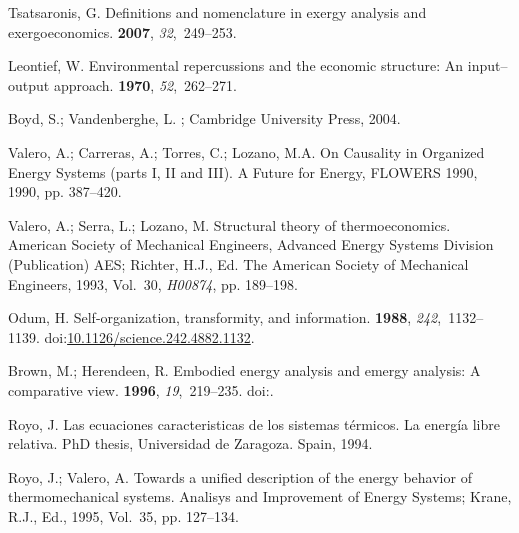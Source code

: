 \documentclass[energies,article,submit,moreauthors,pdftex]{Definitions/mdpi}
\begin{document}
\begin{thebibliography}{99}
	Tsatsaronis, G.
	\newblock Definitions and nomenclature in exergy analysis and exergoeconomics.
	 {\bf 2007}, {\em 32},~249--253.
	
	Leontief, W.
	\newblock Environmental repercussions and the economic structure: An input--output approach.
	 {\bf 1970}, {\em 52},~262--271.
	
	Boyd, S.; Vandenberghe, L.
	; Cambridge University Press,  2004.
	
	Valero, A.; Carreras, A.; Torres, C.; Lozano, M.A.
	\newblock On {C}ausality in {O}rganized {E}nergy {S}ystems (parts {I}, {II} and {III}).
	\newblock  A Future for Energy, FLOWERS 1990,  1990, pp. 387--420.
	
	Valero, A.; Serra, L.; Lozano, M.
	\newblock Structural theory of thermoeconomics.
	\newblock  American Society of Mechanical Engineers, Advanced Energy Systems Division (Publication) AES; Richter, H.J., Ed. The American Society of Mechanical Engineers,  1993, Vol.~30, {\em H00874}, pp. 189--198.
	
	Odum, H.
	\newblock Self-organization, transformity, and information.
	 {\bf 1988}, {\em 242},~1132--1139.
	\newblock doi:{\url{10.1126/science.242.4882.1132}}.
	
	Brown, M.; Herendeen, R.
	\newblock Embodied energy analysis and emergy analysis: A comparative view.
	 {\bf 1996}, {\em 19},~219--235.
	\newblock doi:{\href{https://doi.org/10.1016/S0921-8009(96)00046-8}{}}.
		
	Royo, J.
	\newblock Las ecuaciones caracteristicas de los sistemas térmicos. {L}a
	energía libre relativa.
	\newblock PhD thesis, Universidad de Zaragoza. Spain,  1994.
	
	Royo, J.; Valero, A.
	\newblock Towards a unified description of the energy behavior of
	thermomechanical systems.
	\newblock  Analisys and Improvement of Energy Systems; Krane, R.J., Ed.,  1995, Vol.~35, pp. 127--134.
	

\end{thebibliography}
\end{document}
